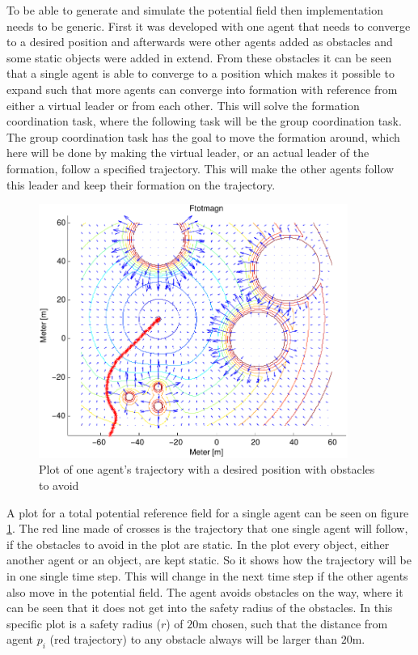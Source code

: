 To be able to generate and simulate the potential field then
implementation needs to be generic. First it was developed with one
agent that needs to converge to a desired position and afterwards were
other agents added as obstacles and some static objects were added in
extend. From these obstacles it can be seen that a single agent is
able to converge to a position which makes it possible to expand such
that more agents can converge into formation with reference from
either a virtual leader or from each other. This will solve the
formation coordination task, where the following task will be the
group coordination task. The group coordination task has the goal to
move the formation around, which here will be done by making the
virtual leader, or an actual leader of the formation, follow a
specified trajectory. This will make the other agents follow this
leader and keep their formation on the trajectory.
\begin{figure}[htbp]
  \includegraphics[width=0.9\textwidth]{fig/ftotmagnfigpdf1}
  \caption{Plot of one agent's trajectory with a desired position with obstacles to avoid}
  \label{fig:potfieldagenti}
\end{figure}
A plot for a total potential reference field for a single agent can be
seen on figure \ref{fig:potfieldagenti}. The red line made of crosses
is the trajectory that one single agent will follow, if the obstacles
to avoid in the plot are static. In the plot every object, either
another agent or an object, are kept static. So it shows how the
trajectory will be in one single time step. This will change in the
next time step if the other agents also move in the potential field.
The agent avoids obstacles on the way, where it can be seen that it
does not get into the safety radius of the obstacles. In this specific
plot is a safety radius ($r$) of $20$m chosen, such that the distance
from agent $p_i$ (red trajectory) to any obstacle always will be
larger than $20$m.

